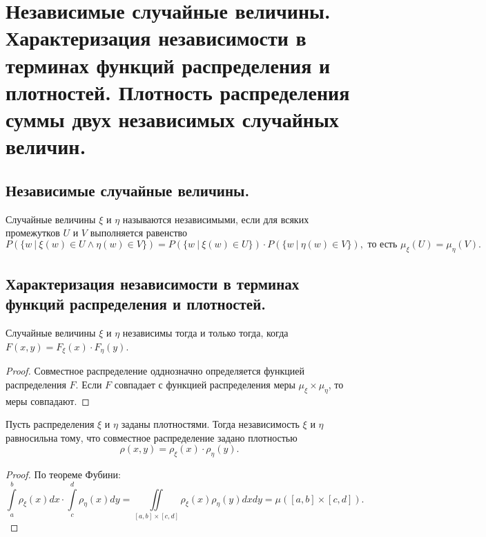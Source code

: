\section{Независимые случайные величины. Характеризация независимости в терминах функций распределения и плотностей. Плотность распределения суммы двух независимых случайных величин.}

\subsection{Независимые случайные величины.}
\begin{definition}
    Случайные величины $\xi$ и $\eta$ называются независимыми, если для всяких промежутков $U$ и $V$ выполняется равенство $$
        P(\{ w \> | \> \xi(w) \in U \wedge \eta(w) \in V \}) =
        P(\{ w \> | \> \xi(w) \in U \}) \cdot P(\{ w \> | \> \eta(w) \in V \}),
        \text{ то есть }
        \mu_\xi(U) = \mu_\eta(V).
    $$
\end{definition}

\subsection{Характеризация независимости в терминах функций распределения и плотностей.}
\begin{theorem}
    Случайные величины $\xi$ и $\eta$ независимы тогда и только тогда, когда
    $F(x,y) = F_\xi(x) \cdot F_\eta(y)$.
    \begin{proof}
        Совместное распределение одднозначно определяется функцией распределения $F$. Если $F$ совпадает с функцией распределения меры $\mu_\xi \times \mu_\eta$, то меры совпадают.
    \end{proof}
\end{theorem}
\begin{theorem}
    Пусть распределения $\xi$ и $\eta$ заданы плотностями. Тогда независимость $\xi$ и $\eta$ равносильна тому, что совместное распределение задано плотностью
    \[
        \rho(x, y) = \rho_\xi(x) \cdot \rho_\eta(y).
    \]
    \begin{proof}
        По теореме Фубини:
        \[
            \int \limits_a^b \rho_\xi(x) dx \cdot 
            \int \limits_c^d \rho_\eta(x) dy =
            \iint \limits_{[a, b] \times [c, d]} \rho_\xi(x) \rho_\eta(y) dx dy =
            \mu([a, b] \times [c, d]).
        \]
    \end{proof}
\end{theorem}

